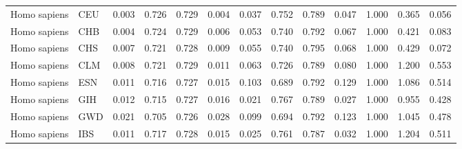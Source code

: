 \begin{longtable}{llrrrrrrrrrrr}
        Homo sapiens &                       CEU &                              0.003 &                               0.726 &                 0.729 &                 0.004 &                              0.037 &                               0.752 &                 0.789 &                 0.047 &        1.000 &  0.365 &  0.056 \\
        Homo sapiens &                       CHB &                              0.004 &                               0.724 &                 0.729 &                 0.006 &                              0.053 &                               0.740 &                 0.792 &                 0.067 &        1.000 &  0.421 &  0.083 \\
        Homo sapiens &                       CHS &                              0.007 &                               0.721 &                 0.728 &                 0.009 &                              0.055 &                               0.740 &                 0.795 &                 0.068 &        1.000 &  0.429 &  0.072 \\
        Homo sapiens &                       CLM &                              0.008 &                               0.721 &                 0.729 &                 0.011 &                              0.063 &                               0.726 &                 0.789 &                 0.080 &        1.000 &  1.200 &  0.553 \\
        Homo sapiens &                       ESN &                              0.011 &                               0.716 &                 0.727 &                 0.015 &                              0.103 &                               0.689 &                 0.792 &                 0.129 &        1.000 &  1.086 &  0.514 \\
        Homo sapiens &                       GIH &                              0.012 &                               0.715 &                 0.727 &                 0.016 &                              0.021 &                               0.767 &                 0.789 &                 0.027 &        1.000 &  0.955 &  0.428 \\
        Homo sapiens &                       GWD &                              0.021 &                               0.705 &                 0.726 &                 0.028 &                              0.099 &                               0.694 &                 0.792 &                 0.123 &        1.000 &  1.045 &  0.478 \\
        Homo sapiens &                       IBS &                              0.011 &                               0.717 &                 0.728 &                 0.015 &                              0.025 &                               0.761 &                 0.787 &                 0.032 &        1.000 &  1.204 &  0.511 \\

\end{longtable}
